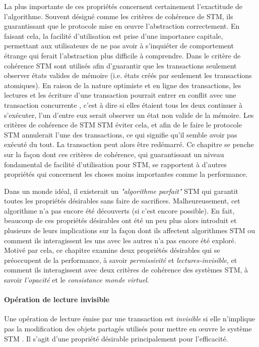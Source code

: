 La plus importante de ces propriétés concernent certainement l'exactitude de l'algorithme.
Souvent désigné comme les critères de cohérence de STM, ils guarantissant que le protocole mise en œuvre l'abstraction correctement.
En faisant cela, la facilité d'utilisation est prise d'une importance capitale,
permettant aux utilisateurs de ne pas avoir à s'inquiéter de comportement étrange qui ferait l'abstraction plus difficile à comprendre.
Dans le critère de cohérence STM sont utilisés afin d'guarantir que les transactions seulement observer états
valides de mémoire (i.e. états créés par seulement les transactions atomiques).
En raison de la nature optimiste et en ligne des transactions, les lectures et les écriture d'une transaction pourrait entrer en conflit
avec une transaction concurrente , c'est à dire si elles étaient tous les deux continuer à s'exécuter, l'un d'entre eux serait observer un état non valide de la mémoire.
Les critères de cohérence de STM STM éviter cela, et afin de le faire le protocole STM annulerait l'une des transactions, ce qui signifie qu'il semble avoir pas exécuté du tout.
La transaction peut alors être redémarré.
Ce chapitre se penche sur la façon dont ces critères de cohérence, qui guarantissant un niveau fondamental de facilité d'utilisation pour STM,
se rapportent à d'autres propriétés qui concernent les choses moins importantes comme la performance.


Dans un monde idéal, il existerait un \emph{"algorithme parfait"} STM qui garantit toutes les propriétés désirables sans faire de sacrifices.
Malheureusement, cet algorithme n'a pas encore été découverts (si c'est encore possible).
En fait, beaucoup de ces propriétés désirables ont été un peu plus alors introduit et plusieurs de leurs implications sur la façon
dont ils affectent algorithmes STM ou comment ils interagissent les uns avec les autres n'a pas encore été exploré.
Motivé par cela, ce chapitre examine deux propriétés désirables qui se préoccupent de la performance,
à savoir \emph{permissivité} et \emph{lectures-invisible}, et comment ils interagissent avec deux critères de cohérence des systèmes STM,
à savoir \emph{l'opacité} et le \emph{consistance monde virtuel}.



\paragraph{Opération de lecture invisible}
Une opération de lecture émise par une transaction est {\it invisible}
si elle n'implique pas la modification des objets partagés utilisés pour mettre en œuvre le système STM \cite{MSHAESS06}.
Il s'agit d'une propriété désirable principalement pour l'efficacité.


